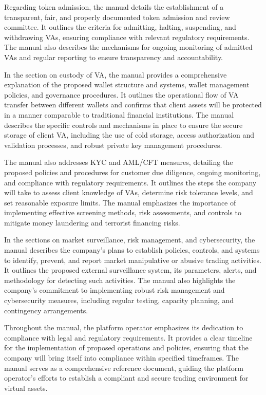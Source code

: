 \documentclass[]{report}
\begin{document}
Regarding token admission, the manual details the establishment of a
transparent, fair, and properly documented token admission and review
committee. It outlines the criteria for admitting, halting,
suspending, and withdrawing VAs, ensuring compliance with relevant
regulatory requirements. The manual also describes the mechanisms for
ongoing monitoring of admitted VAs and regular reporting to ensure
transparency and accountability.

In the section on custody of VA, the manual provides a comprehensive
explanation of the proposed wallet structure and systems, wallet
management policies, and governance procedures. It outlines the
operational flow of VA transfer between different wallets and confirms
that client assets will be protected in a manner comparable to
traditional financial institutions. The manual describes the specific
controls and mechanisms in place to ensure the secure storage of
client VA, including the use of cold storage, access authorization and
validation processes, and robust private key management procedures.

The manual also addresses KYC and AML/CFT measures, detailing the
proposed policies and procedures for customer due diligence, ongoing
monitoring, and compliance with regulatory requirements. It outlines
the steps the company will take to assess client knowledge of VAs,
determine risk tolerance levels, and set reasonable exposure
limits. The manual emphasizes the importance of implementing effective
screening methods, risk assessments, and controls to mitigate money
laundering and terrorist financing risks.

In the sections on market surveillance, risk management, and
cybersecurity, the manual describes the company's plans to establish
policies, controls, and systems to identify, prevent, and report
market manipulative or abusive trading activities. It outlines the
proposed external surveillance system, its parameters, alerts, and
methodology for detecting such activities. The manual also highlights
the company's commitment to implementing robust risk management and
cybersecurity measures, including regular testing, capacity planning,
and contingency arrangements.

Throughout the manual, the platform operator emphasizes its dedication
to compliance with legal and regulatory requirements. It provides a
clear timeline for the implementation of proposed operations and
policies, ensuring that the company will bring itself into compliance
within specified timeframes. The manual serves as a comprehensive
reference document, guiding the platform operator's efforts to
establish a compliant and secure trading environment for virtual
assets.
\end{document}
